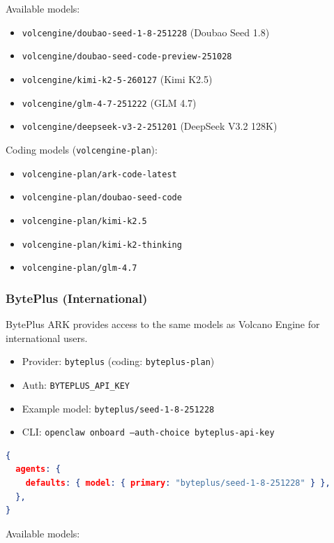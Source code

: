 Available models:

\begin{itemize}
  \item \texttt{volcengine/doubao-seed-1-8-251228} (Doubao Seed 1.8)
  \item \texttt{volcengine/doubao-seed-code-preview-251028}
  \item \texttt{volcengine/kimi-k2-5-260127} (Kimi K2.5)
  \item \texttt{volcengine/glm-4-7-251222} (GLM 4.7)
  \item \texttt{volcengine/deepseek-v3-2-251201} (DeepSeek V3.2 128K)
\end{itemize}


Coding models (\texttt{volcengine-plan}):

\begin{itemize}
  \item \texttt{volcengine-plan/ark-code-latest}
  \item \texttt{volcengine-plan/doubao-seed-code}
  \item \texttt{volcengine-plan/kimi-k2.5}
  \item \texttt{volcengine-plan/kimi-k2-thinking}
  \item \texttt{volcengine-plan/glm-4.7}
\end{itemize}


\subsubsection{BytePlus (International)}


BytePlus ARK provides access to the same models as Volcano Engine for international users.

\begin{itemize}
  \item Provider: \texttt{byteplus} (coding: \texttt{byteplus-plan})
  \item Auth: \texttt{BYTEPLUS\_API\_KEY}
  \item Example model: \texttt{byteplus/seed-1-8-251228}
  \item CLI: \texttt{openclaw onboard --auth-choice byteplus-api-key}
\end{itemize}


\begin{lstlisting}[language=json]
{
  agents: {
    defaults: { model: { primary: "byteplus/seed-1-8-251228" } },
  },
}
\end{lstlisting}


Available models:


